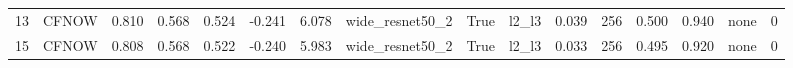 \begin{tabular}{rlrrrrrlllrlrrlr}
    13 &  CFNOW &           0.810 &    0.568 &       0.524 &                         -0.241 &                6.078 & wide\_resnet50\_2 &               True &             l2\_l3 &                          0.039 &                   256 &                      0.500 &                       0.940 &                         none &        0 \\
    15 &  CFNOW &           0.808 &    0.568 &       0.522 &                         -0.240 &                5.983 & wide\_resnet50\_2 &               True &             l2\_l3 &                          0.033 &                   256 &                      0.495 &                       0.920 &                         none &        0 \\
\bottomrule
\end{tabular}
